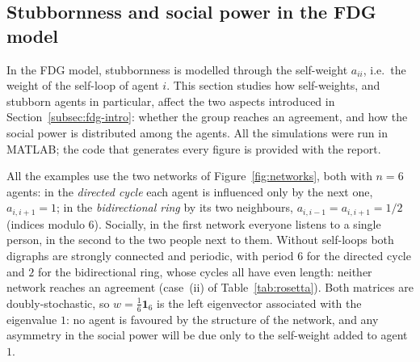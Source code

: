 \subsection{Stubbornness and social power in the FDG model}
\label{subsec:fdg-stub}

In the FDG model, stubbornness is modelled through the self-weight $a_{ii}$, i.e.\ the
weight of the self-loop of agent $i$.
 This section studies how
self-weights, and stubborn agents in particular, affect the two aspects introduced in
Section~\ref{subsec:fdg-intro}: whether the group reaches an agreement, and how the
social power is distributed among the agents. All the simulations were run in MATLAB;
the code that generates every figure is provided with the report.

All the examples use the two networks of Figure~\ref{fig:networks}, both with $n = 6$
agents: in the \emph{directed cycle} each agent is influenced only by the next one,
$a_{i,i+1} = 1$; in the \emph{bidirectional ring} by its two neighbours,
$a_{i,i-1} = a_{i,i+1} = 1/2$ (indices modulo $6$). Socially, in the first network
everyone listens to a single person, in the second to the two people next to them.
Without self-loops both digraphs are strongly connected and periodic, with period $6$
for the directed cycle and $2$ for the bidirectional ring, whose cycles all have even
length: neither network reaches an agreement (case~(ii) of Table~\ref{tab:rosetta}).
Both matrices are doubly-stochastic, so $w = \frac{1}{6}\mathbf{1}_6$ is the left
eigenvector associated with the eigenvalue $1$: no agent is favoured by the structure
of the network, and any asymmetry in the social power will be due only to the
self-weight added to agent~$1$.

